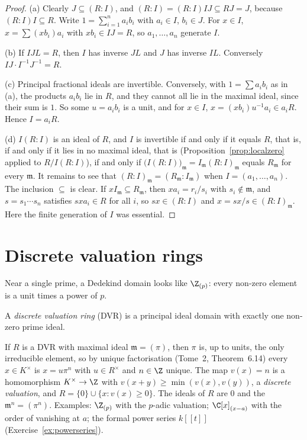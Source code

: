 \begin{proof}
(a) Clearly $J\subseteq(R:I)$, and $(R:I)=(R:I)IJ\subseteq RJ=J$, because $(R:I)I\subseteq R$. Write $1=\sum_{i=1}^na_ib_i$ with $a_i\in I$, $b_i\in J$. For $x\in I$, $x=\sum(xb_i)a_i$ with $xb_i\in IJ=R$, so
$a_1,\dots,a_n$ generate $I$.

(b) If $IJL=R$, then $I$ has inverse $JL$ and $J$ has inverse $IL$. Conversely $IJ\cdot I^{-1}J^{-1}=R$.

(c) Principal fractional ideals are invertible. Conversely, with $1=\sum a_ib_i$ as in (a), the products $a_ib_i$ lie in $R$, and they cannot all lie in the maximal ideal, since their sum is $1$. So some $u=a_ib_i$ is a unit,
and for $x\in I$, $x=(xb_i)u^{-1}a_i\in a_iR$. Hence $I=a_iR$.

(d) $I(R:I)$ is an ideal of $R$, and $I$ is invertible if and only if it equals $R$, that is, if and only if it lies in no maximal ideal, that is (Proposition~\ref{prop:localzero} applied to $R/I(R:I)$), if and only if
$\bigl(I(R:I)\bigr)_{\mathfrak m}=I_{\mathfrak m}(R:I)_{\mathfrak m}$ equals $R_{\mathfrak m}$ for every $\mathfrak m$. It remains to see that $(R:I)_{\mathfrak m}=(R_{\mathfrak m}:I_{\mathfrak m})$ when $I=(a_1,\dots,a_n)$.
The inclusion $\subseteq$ is clear. If $xI_{\mathfrak m}\subseteq R_{\mathfrak m}$, then $xa_i=r_i/s_i$ with $s_i\notin\mathfrak m$, and $s=s_1\cdots s_n$ satisfies $sxa_i\in R$ for all $i$, so $sx\in(R:I)$ and
$x=sx/s\in(R:I)_{\mathfrak m}$. Here the finite generation of $I$ was essential.
\end{proof}

\section{Discrete valuation rings}

Near a single prime, a Dedekind domain looks like $\Z_{(p)}$: every non-zero element is a unit times a power of $p$.

\begin{definition}\label{def:dvr}
A \emph{discrete valuation ring} (DVR) is a principal ideal domain with exactly one non-zero prime ideal.
\end{definition}

If $R$ is a DVR with maximal ideal $\mathfrak m=(\pi)$, then $\pi$ is, up to units, the only irreducible element, so by unique factorisation (Tome~2, Theorem~6.14) every $x\in K^\times$ is $x=u\pi^n$ with $u\in R^\times$ and
$n\in\Z$ unique. The map $v(x)=n$ is a homomorphism $K^\times\to\Z$ with $v(x+y)\ge\min(v(x),v(y))$, a \emph{discrete valuation}, and $R=\{0\}\cup\{x:v(x)\ge0\}$. The ideals of $R$ are $0$ and the $\mathfrak m^n=(\pi^n)$.
Examples: $\Z_{(p)}$ with the $p$-adic valuation; $\C[x]_{(x-a)}$ with the order of vanishing at $a$; the formal power series $k[[t]]$ (Exercise~\ref{ex:powerseries}).


